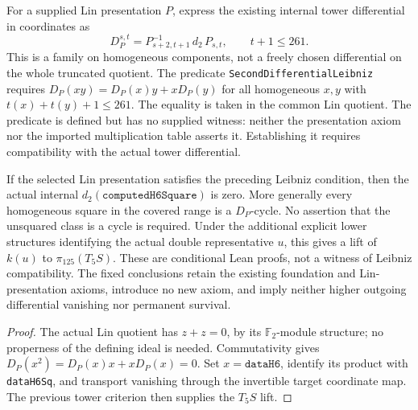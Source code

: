 \begin{definition}
  \label{def:h6-lin-second-differential}
  \notready
  For a supplied Lin presentation $P$, express the existing internal tower
  differential in coordinates as
  \[
    D_P^{s,t}=P_{s+2,t+1}^{-1}\,d_2\,P_{s,t},\qquad t+1\le261.
  \]
  This is a family on homogeneous components, not a freely chosen
  differential on the whole truncated quotient. The predicate
  \texttt{SecondDifferentialLeibniz} requires
  $D_P(xy)=D_P(x)y+xD_P(y)$ for all homogeneous $x,y$ with
  $t(x)+t(y)+1\le261$. The equality is taken in the common Lin quotient.
  The predicate is defined but has no supplied witness: neither the
  presentation axiom nor the imported multiplication table asserts it.
  Establishing it requires compatibility with the actual tower differential.
\end{definition}

\begin{proposition}
  \label{prop:h6-d2-zero-from-leibniz}
  \notready
  If the selected Lin presentation satisfies the preceding Leibniz
  condition, then the actual internal $d_2(\texttt{computedH6Square})$ is zero.
  More generally every homogeneous square in the covered range is a
  $D_P$-cycle. No assertion that the unsquared class is a cycle is required.
  Under the additional explicit lower structures identifying the actual
  double representative $u$, this gives a lift of $k(u)$ to $\pi_{125}(T_5S)$.
  These are conditional Lean proofs, not a witness of Leibniz compatibility.
  The fixed conclusions retain the existing foundation and Lin-presentation
  axioms, introduce no new axiom, and imply neither higher outgoing
  differential vanishing nor permanent survival.
\end{proposition}
\begin{proof}
  The actual Lin quotient has $z+z=0$, by its $\mathbb F_2$-module structure;
  no properness of the defining ideal is needed. Commutativity gives
  $D_P(x^2)=D_P(x)x+xD_P(x)=0$.
  Set $x=\texttt{dataH6}$, identify its product with \texttt{dataH6Sq}, and
  transport vanishing through the invertible target coordinate map.
  The previous tower criterion then supplies the $T_5S$ lift.
\end{proof}

